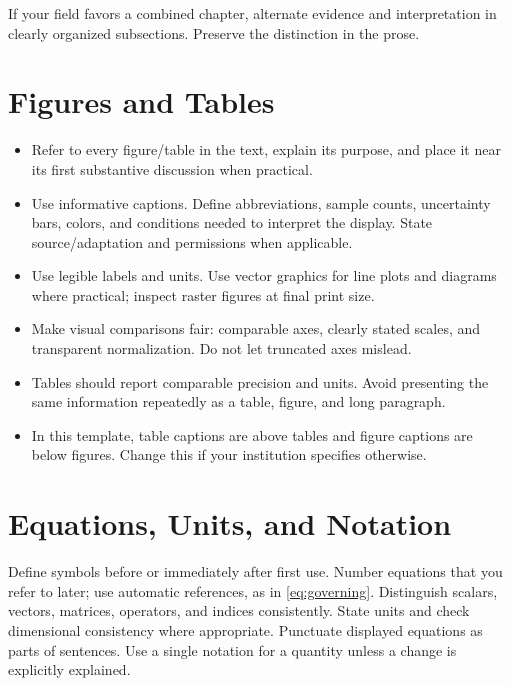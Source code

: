 \documentclass[12pt,a4paper,oneside]{report}
\begin{document}
If your field favors a combined chapter, alternate evidence and interpretation
in clearly organized subsections. Preserve the distinction in the prose.

\section{Figures and Tables}
\begin{itemize}
\item Refer to every figure/table in the text, explain its purpose, and place
it near its first substantive discussion when practical.
\item Use informative captions. Define abbreviations, sample counts,
uncertainty bars, colors, and conditions needed to interpret the display.
State source/adaptation and permissions when applicable.
\item Use legible labels and units. Use vector graphics for line plots and
diagrams where practical; inspect raster figures at final print size.
\item Make visual comparisons fair: comparable axes, clearly stated scales,
and transparent normalization. Do not let truncated axes mislead.
\item Tables should report comparable precision and units. Avoid presenting
the same information repeatedly as a table, figure, and long paragraph.
\item In this template, table captions are above tables and figure captions
are below figures. Change this if your institution specifies otherwise.
\end{itemize}

\section{Equations, Units, and Notation}
Define symbols before or immediately after first use. Number equations
that you refer to later; use automatic references, as in
\cref{eq:governing}. Distinguish scalars, vectors, matrices, operators,
and indices consistently. State units and check dimensional consistency
where appropriate. Punctuate displayed equations as parts of sentences.
Use a single notation for a quantity unless a change is explicitly explained.
\end{document}
